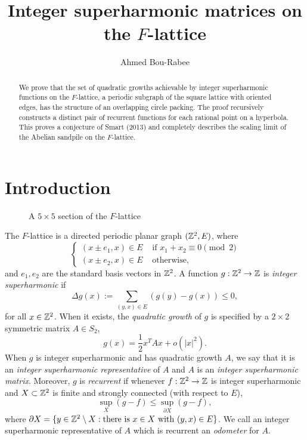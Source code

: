 \documentclass[12pt]{amsart}
\title{Integer superharmonic matrices on the $F$-lattice }
\author{Ahmed Bou-Rabee}
\begin{document}
	
	
	\begin{abstract}
	We prove that the set of quadratic growths achievable by integer superharmonic functions on the $F$-lattice, a periodic subgraph of the square lattice with oriented edges, has the structure of an overlapping circle packing. The proof recursively constructs a distinct pair of recurrent functions for each rational point on a hyperbola. This proves a conjecture of Smart (2013) and completely describes the scaling limit of the Abelian sandpile on the $F$-lattice.
		
		
	\end{abstract}
	\maketitle
	
	
	\section{Introduction}
	\begin{figure}
		
		\caption{A $5 \times 5$ section of the $F$-lattice}
	\end{figure}
	
	The $F$-lattice is a directed periodic planar graph $(\mathbb{Z}^2, E)$, where
	\[
	\begin{cases}
	(x \pm e_1,x) \in E &\mbox{ if $x_1 + x_2  \equiv 0 \pmod 2$} \\
	(x \pm e_2,x) \in E &\mbox{ otherwise},
	\end{cases}
	\]
	and $e_1,e_2$ are the standard basis vectors in $\mathbb{Z}^2$. A function $g:\mathbb{Z}^2 \to \mathbb{Z}$ is {\it integer superharmonic} if 
	\begin{equation} \label{eq:superharmonic}
	\Delta g(x) := \sum_{(y,x) \in E} (g(y) - g(x)) \leq 0,
	\end{equation}
	for all $x \in \mathbb{Z}^2$.  When it exists, the {\it quadratic growth} of $g$ 
	is specified by a $2 \times 2$ symmetric matrix $A \in S_2$, 
	\begin{equation} \label{eq:quadratic_growth}
	g(x) = \frac{1}{2} x^T A x + o(|x|^2).
	\end{equation}
	When $g$ is integer superharmonic and has quadratic growth $A$, we say that it is an {\it integer superharmonic representative} of $A$
	and $A$ is an {\it integer superharmonic matrix}. Moreover, $g$ is {\it recurrent} if whenever $f:\mathbb{Z}^2 \to \mathbb{Z}$  is integer superharmonic and $X \subset \mathbb{Z}^2$ is finite and strongly connected (with respect to $E$), 
	\begin{equation}
	\sup_{X} (g - f) \leq \sup_{\partial X} (g - f),
	\end{equation}
	where $\partial X = \{ y \in \mathbb{Z}^2 \setminus X : \mbox{there is $x \in X$ with $(y,x) \in E$}\}$. 
	We call an integer superharmonic representative of $A$ which is recurrent an {\it odometer} 
	for $A$. 
	
\end{document}
